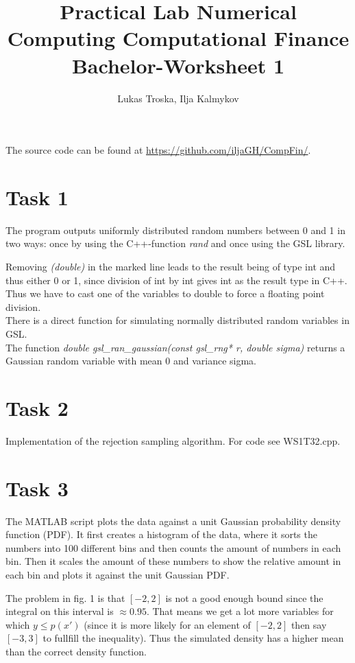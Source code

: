 \documentclass[]{article}
\title{Practical Lab Numerical Computing Computational Finance \\Bachelor-Worksheet 1}
\author{Lukas Troska, Ilja Kalmykov}
\date{}
\begin{document}
\maketitle 

The source code can be found at \url{https://github.com/iljaGH/CompFin/}.

\section*{Task 1} The program outputs uniformly distributed random
numbers between 0 and 1 in two ways: once by using the C++-function \textit{rand} and
once using the GSL library.

Removing \textit{(double)} in the marked line leads to the result being of type int and thus
either 0 or 1, since division of int by int gives int as the result type in C++.
Thus we have to cast one of the variables to double to force a floating point
division.\\

There is a direct function for simulating normally distributed random variables in GSL.\\
The function \textit{double gsl\_ran\_gaussian(const gsl\_rng* r, double sigma)} returns a
Gaussian random variable with mean 0 and variance sigma.

\section*{Task 2}
Implementation of the rejection sampling algorithm. For code see WS1T32.cpp.

\section*{Task 3} The MATLAB script plots the data against a unit Gaussian
probability density function (PDF). It first creates a histogram of the data, where it
sorts the numbers into 100 different bins and then counts the amount of numbers
in each bin. Then it scales the amount of these numbers to show the relative
amount in each bin and plots it against the unit Gaussian PDF.

The problem in fig. 1 is that $[-2,2]$ is not a good enough bound since the
integral on this interval is $\approx 0.95$. That means we get a lot more variables for which
$y\le p(x')$ (since it is more likely for an element of $[-2,2]$ then say
$[-3,3]$ to fullfill the inequality). Thus the simulated density has a higher mean than the correct density function.
\end{document}
